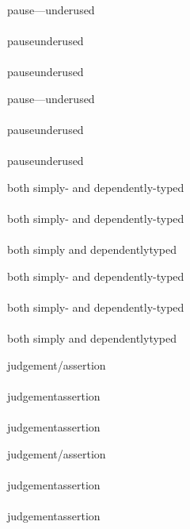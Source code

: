 \documentclass{article}
\begin{document}
\begin{verbatim*}
\begin{minipage}{0pt}
pause---underused\\\\
pause\mdash{}underused\\\\
pause\nbmdash{}underused\\
\end{minipage}
\end{verbatim*}
%
\begin{minipage}{0pt}
  pause---underused\\\\
  pause\mdash{}underused\\\\
  pause\nbmdash{}underused\\
\end{minipage}

\begin{verbatim*}
\begin{minipage}{0pt}
both simply- and dependently-typed\\\\
both simply\hyp{} and dependently\hyp{}typed\\\\
both simply\nbhyp{} and dependently\nbhyp{}typed\\
\end{minipage}
\end{verbatim*}
%
\begin{minipage}{0pt}
  both simply- and dependently-typed\\\\
  both simply\hyp{} and dependently\hyp{}typed\\\\
  both simply\nbhyp{} and dependently\nbhyp{}typed\\
\end{minipage}

\begin{verbatim*}
\begin{minipage}{0pt}
judge\-ment/assertion\\\\
judge\-ment\fwdslash{}assertion\\\\
judge\-ment\nbfwdslash{}assertion\\
\end{minipage}
\end{verbatim*}
%
\begin{minipage}{0pt}
  judge\-ment/assertion\\\\
  judge\-ment\fwdslash{}assertion\\\\
  judge\-ment\nbfwdslash{}assertion\\
\end{minipage}
\end{document}
